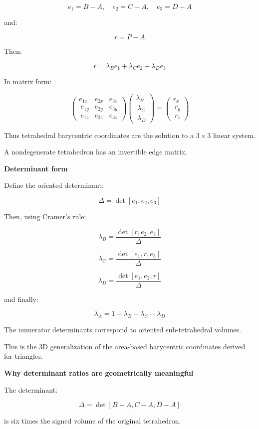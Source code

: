 \[
e_1=B-A,\quad e_2=C-A,\quad e_3=D-A
\]

and:

\[
r=P-A
\]

Then:

\[
\boxed{ r=\lambda_Be_1+\lambda_Ce_2+\lambda_De_3 }
\]

In matrix form:

\[
\begin{pmatrix} e_{1x}&e_{2x}&e_{3x}\\\ e_{1y}&e_{2y}&e_{3y}\\\ e_{1z}&e_{2z}&e_{3z} \end{pmatrix} \begin{pmatrix} \lambda_B\\\ \lambda_C\\\ \lambda_D \end{pmatrix} = \begin{pmatrix} r_x\\\ r_y\\\ r_z \end{pmatrix}
\]

Thus tetrahedral barycentric coordinates are the solution to a \(3\times3\) linear system.

A nondegenerate tetrahedron has an invertible edge matrix.

\textbf{Determinant form}

Define the oriented determinant:

\[
\Delta= \det[e_1,e_2,e_3]
\]

Then, using Cramer's rule:

\[
\boxed{ \lambda_B= \frac{\det[r,e_2,e_3]}{\Delta} }
\]

\[
\boxed{ \lambda_C= \frac{\det[e_1,r,e_3]}{\Delta} }
\]

\[
\boxed{ \lambda_D= \frac{\det[e_1,e_2,r]}{\Delta} }
\]

and finally:

\[
\boxed{ \lambda_A=1-\lambda_B-\lambda_C-\lambda_D }
\]

The numerator determinants correspond to oriented sub-tetrahedral volumes.

This is the 3D generalization of the area-based barycentric coordinates derived for triangles.

\textbf{Why determinant ratios are geometrically meaningful}

The determinant:

\[
\Delta=\det[B-A,C-A,D-A]
\]

is six times the signed volume of the original tetrahedron.

